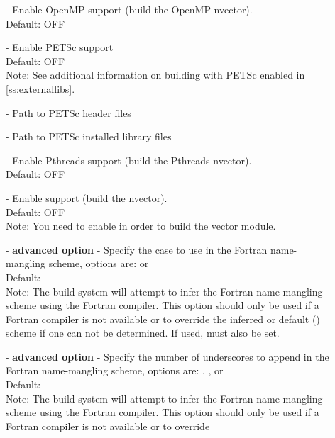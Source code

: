 \begin{description}
\item[] -
  Enable OpenMP support (build the OpenMP nvector).
  \\
  Default: OFF 
\item[] - 
  Enable PETSc support
  \\
  Default: OFF 
  \\
  Note: See additional information on building with PETSc enabled
  in \ref{ss:externallibs}.
\item[] -
  Path to PETSc header files
\item[] - 
  Path to PETSc installed library files
\item[] -  
  Enable Pthreads support (build the Pthreads nvector).
  \\
  Default: OFF 
\item[] - 
  Enable {\raja} support (build the {\raja} nvector).
  \\
  Default: OFF 
  \\
  Note: You need to enable {\cuda} in order to build the {\raja} vector module.
\item[] - \textbf{advanced option} -
  Specify the case to use in the Fortran name-mangling scheme, options
  are:  or 
  \\
  Default:
  \\
  Note: The build system will attempt to infer the Fortran
  name-mangling scheme using the Fortran compiler. This option should
  only be used if a Fortran compiler is not available or to override
  the inferred or default () scheme if one can not be
  determined. If used,  must also
  be set.
\item[] - \textbf{advanced option} -
  Specify the number of underscores to append in the Fortran
  name-mangling scheme, options are: , , or 
  \\
  Default:
  \\
  Note: The build system will attempt to infer the Fortran
  name-mangling scheme using the Fortran compiler. This option should
  only be used if a Fortran compiler is not available or to override

\end{description}
